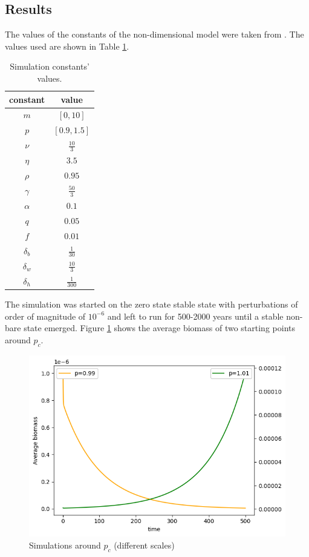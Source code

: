 \documentclass{article}
\numberwithin{equation}{section}
\begin{document}
\subsection{Results}
The values of the constants of the non-dimensional model were taken from \parencite[]{gilad_mathematical_2007}. The values used are shown in Table  \ref{table:constants_tables}.
\begin{table}[!ht]
    \centering
    \begin{tabular}{||cc||}
        \hline
        constant   & value           \\
        \hline\hline
        $m$        & $[0, 10]$       \\
        $p$        & $[0.9, 1.5]$    \\
        $\nu$      & $\frac{10}{3}$  \\
        $\eta$     & $3.5$           \\
        $\rho$     & $0.95$          \\
        $\gamma$   & $\frac{50}{3}$  \\
        $\alpha$   & $0.1$           \\
        $q$        & $0.05$          \\
        $f$        & $0.01$          \\
        $\delta_b$ & $\frac{1}{30}$  \\
        $\delta_w$ & $\frac{10}{3}$  \\
        $\delta_h$ & $\frac{1}{300}$ \\
        \hline
    \end{tabular}
    \caption{Simulation constants' values.}
    \label{table:constants_tables}
\end{table}

The simulation was started on the zero state stable state with perturbations of order of magnitude of $10^{-6}$ and left to run for 500-2000 years until a stable non-bare state emerged. Figure \ref{fig:critical_point} shows the average biomass of two starting points around $p_c$.
\begin{figure}[!ht]
    \centering
    \includegraphics[scale=0.5]{plots/critical point.png}
    \caption{Simulations around $p_c$ (different scales)}
    \label{fig:critical_point}
\end{figure}
\end{document}
